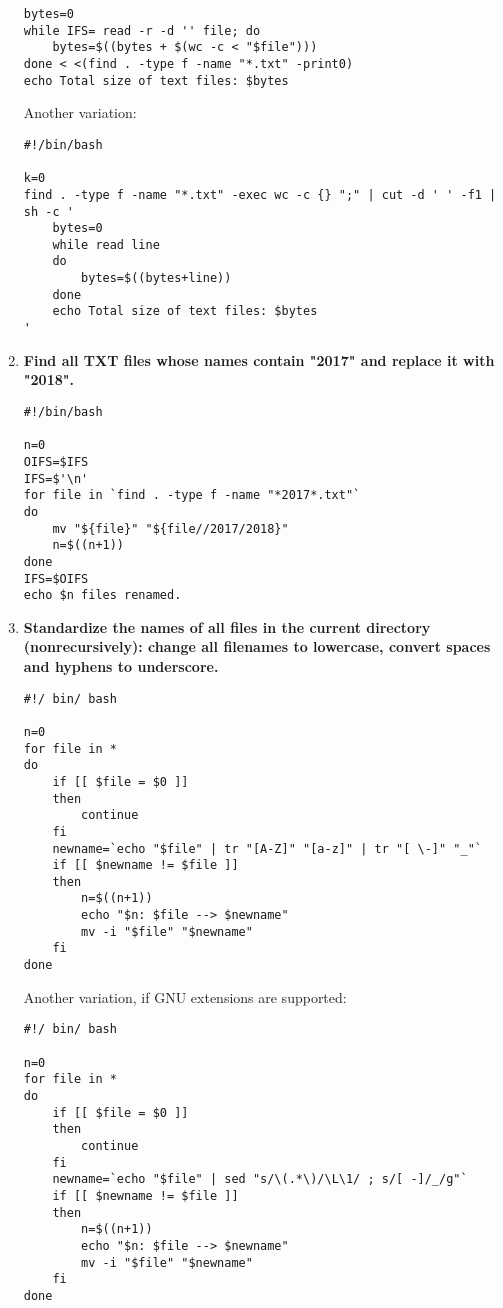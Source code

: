 \documentclass[12pt,a4paper]{article}
\begin{document}
\begin{enumerate}[label=\textbf{\arabic*}.]
\begin{lstlisting}
bytes=0
while IFS= read -r -d '' file; do
	bytes=$((bytes + $(wc -c < "$file")))
done < <(find . -type f -name "*.txt" -print0)
echo Total size of text files: $bytes
\end{lstlisting}

Another variation:

\begin{lstlisting}
#!/bin/bash

k=0
find . -type f -name "*.txt" -exec wc -c {} ";" | cut -d ' ' -f1 | sh -c '
	bytes=0
	while read line
	do
		bytes=$((bytes+line))
	done
	echo Total size of text files: $bytes
'
\end{lstlisting}


\item \textbf{Find all TXT files whose names contain "2017" and replace it with "2018".}

\begin{lstlisting}
#!/bin/bash

n=0
OIFS=$IFS
IFS=$'\n'
for file in `find . -type f -name "*2017*.txt"`
do
	mv "${file}" "${file//2017/2018}"
	n=$((n+1))
done
IFS=$OIFS
echo $n files renamed.
\end{lstlisting}


\item \textbf{Standardize the names of all files in the current directory (nonrecursively): change all filenames to lowercase, convert spaces and hyphens to underscore.}

\begin{lstlisting}
#!/ bin/ bash

n=0
for file in *
do
	if [[ $file = $0 ]]
	then
		continue
	fi
	newname=`echo "$file" | tr "[A-Z]" "[a-z]" | tr "[ \-]" "_"`
	if [[ $newname != $file ]]
	then
		n=$((n+1))
		echo "$n: $file --> $newname"
		mv -i "$file" "$newname"
	fi
done
\end{lstlisting}

\clearpage

Another variation, if GNU extensions are supported:

\begin{lstlisting}
#!/ bin/ bash

n=0
for file in *
do
	if [[ $file = $0 ]]
	then
		continue
	fi
	newname=`echo "$file" | sed "s/\(.*\)/\L\1/ ; s/[ -]/_/g"`
	if [[ $newname != $file ]]
	then
		n=$((n+1))
		echo "$n: $file --> $newname"
		mv -i "$file" "$newname"
	fi
done
\end{lstlisting}


\end{enumerate}
\end{document}
